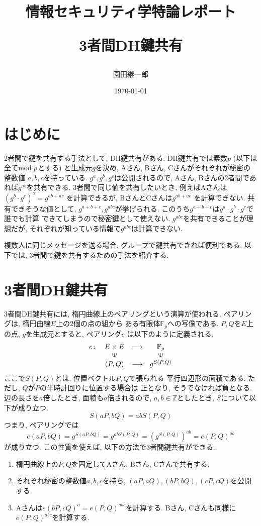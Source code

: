 \documentclass[a4paper,11pt]{jsarticle}
\begin{document}
\title{情報セキュリティ学特論レポート

3者間DH鍵共有}
\author{園田継一郎}
\date{\today}
\maketitle

\section{はじめに}
2者間で鍵を共有する手法として, DH鍵共有がある.
DH鍵共有では素数$p$ (以下は全て${\rm mod}\hspace{3pt} p$とする)
と生成元$g$を決め, 
Aさん, Bさん, Cさんがそれぞれが秘密の整数値
$a, b, c$を持っている.
$g^a, g^b, g^c$は公開されるので, 
Aさん, Bさんの2者間であれば$g^{ab}$を共有できる.
3者間で同じ値を共有したいとき,
例えばAさんは$(g^b \cdot g^c)^a = g^{ab + ac}$
を計算できるが, BさんとCさんは$g^{ab + ac}$
を計算できない.
共有できそうな値として, $g^{a + b + c}, g^{abc}$が挙げられる.
このうち$g^{a + b + c}$は$g^a \cdot g^b \cdot g^c$で誰でも計算
できてしまうので秘密鍵として使えない.
$g^{abc}$を共有できることが理想だが, 
それぞれが知っている情報で$g^{abc}$は計算できない.

複数人に同じメッセージを送る場合,
グループで鍵共有できれば便利である.
以下では, 3者間で鍵を共有するための手法を紹介する.

\section{3者間DH鍵共有}
3者間DH鍵共有には, 楕円曲線上のペアリングという演算が使われる.
ペアリングは, 楕円曲線$E$上の2個の点の組から
ある有限体$\mathbb{F}_p$への写像である\cite{bib1}.
$P, Q$を$E$上の点, $g$を生成元とすると, ペアリング$e$
は以下のように定義される.
\[
  \begin{array}{rccc}
    e \colon & E \times E & \longrightarrow & \mathbb{F}_p \\
            & \rotatebox{90}{$\in$} & & \rotatebox{90}{$\in$} \\
            & (P, Q) & \longmapsto & g^{S(P, Q)}
  \end{array}
\]
ここで$S(P, Q)$とは, 位置ベクトル$P, Q$で張られる
平行四辺形の面積である. ただし, $Q$が$P$の半時計回りに位置する場合は
正となり, そうでなければ負となる. 辺の長さを$a$倍したとき, 
面積も$a$倍されるので, $a, b \in \mathbb{Z}$としたとき, 
$S$について以下が成り立つ. 
\[
  S(aP, bQ) = abS(P, Q)
\]
つまり, ペアリングでは
\[
  e(aP, bQ) = g^{S(aP, bQ)} = g^{abS(P, Q)} =
  \left(g^{S(P, Q)}\right)^{ab} = e(P, Q)^{ab}
\]
が成り立つ. この性質を使えば, 以下の方法で3者間鍵共有ができる.
\begin{enumerate}
  \item 楕円曲線上の$P, Q$を固定してAさん, Bさん, Cさんで共有する.
  \item それぞれ秘密の整数値$a, b, c$を持ち, $(aP, aQ), (bP, bQ), (cP, cQ)$を公開する.
  \item Aさんは$e(bP, cQ)^a = e(P, Q)^{abc}$を計算する.
    Bさん, Cさんも同様に$e(P, Q)^{abc}$を計算する.
\end{enumerate}
\end{document}
